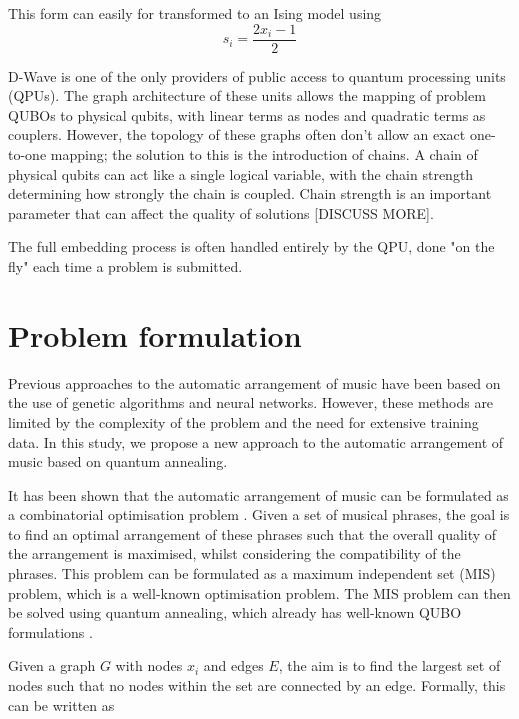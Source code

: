 \documentclass[aps,pra,10pt,twocolumn]{revtex4-2}
\begin{document}
This form can easily for transformed to an Ising model using
\begin{equation}
    s_i = \frac{2x_i - 1}{2}
    \label{eq:qubo-ising}
\end{equation}

D-Wave is one of the only providers of public access to quantum processing units (QPUs). The graph architecture of these units allows the mapping of problem QUBOs to physical qubits, with linear terms as nodes and quadratic terms as couplers. However, the topology of these graphs often don't allow an exact one-to-one mapping; the solution to this is the introduction of chains. A chain of physical qubits can act like a single logical variable, with the chain strength determining how strongly the chain is coupled. Chain strength is an important parameter that can affect the quality of solutions [DISCUSS MORE].

The full embedding process is often handled entirely by the QPU, done "on the fly" each time a problem is submitted. 

\section{Problem formulation}

Previous approaches to the automatic arrangement of music have been based on the use of genetic algorithms and neural networks. However, these methods are limited by the complexity of the problem and the need for extensive training data. In this study, we propose a new approach to the automatic arrangement of music based on quantum annealing.

It has been shown that the automatic arrangement of music can be formulated as a combinatorial optimisation problem \cite{moses_computational_2016}. Given a set of musical phrases, the goal is to find an optimal arrangement of these phrases such that the overall quality of the arrangement is maximised, whilst considering the compatibility of the phrases. This problem can be formulated as a maximum independent set (MIS) problem, which is a well-known optimisation problem. The MIS problem can then be solved using quantum annealing, which already has well-known QUBO formulations \cite{lucas_ising_2014}.

Given a graph $G$ with nodes $x_i$ and edges $E$, the aim is to find the largest set of nodes such that no nodes within the set are connected by an edge. Formally, this can be written as
\end{document}
